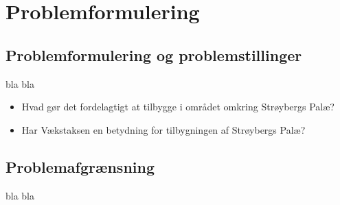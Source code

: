 \chapter{Problemformulering}

\section{Problemformulering og problemstillinger}
bla bla
\begin{itemize} 
	\item Hvad gør det fordelagtigt at tilbygge i området omkring Strøybergs Palæ? 
	\item Har Vækstaksen en betydning for tilbygningen af Strøybergs Palæ? 
\end{itemize} 

\section{Problemafgrænsning}
bla bla